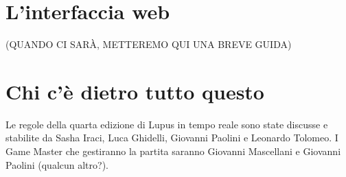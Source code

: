 \documentclass[a4paper,10pt]{article}
\begin{document}
\pagebreak
\section{L'interfaccia web}
(QUANDO CI SARÀ, METTEREMO QUI UNA BREVE GUIDA)

\section{Chi c'è dietro tutto questo}

Le regole della quarta edizione di Lupus in tempo reale sono state discusse e stabilite da Sasha Iraci, Luca Ghidelli, Giovanni Paolini e Leonardo Tolomeo.
I Game Master che gestiranno la partita saranno Giovanni Mascellani e Giovanni Paolini (qualcun altro?).
\end{document}
